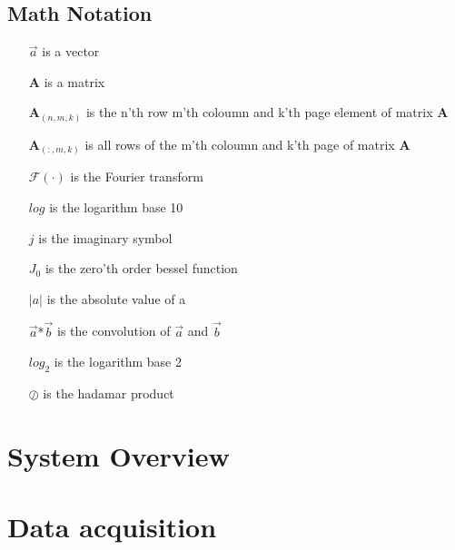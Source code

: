 \chapter*{Math Notation}
\begin{itemize}
\item[{$\overrightarrow{a}$}] is a vector
\item[{$\textbf{A}$}] is a matrix
\item[{$\textbf{A}_{(n,m,k)}$}] is the n'th row m'th coloumn and k'th page element of matrix \textbf{A}
\item[{$\textbf{A}_{(:,m,k)}$}] is all rows of the m'th coloumn and k'th page of matrix \textbf{A}
\item[{$\mathcal{F}(\cdot)$}] is the Fourier transform
\item[{$log$}] is the logarithm base 10
\item[{$j$}] is the imaginary symbol
\item[{$J_0$}] is the zero'th order bessel function
\item[{$|a|$}] is the absolute value of a
\item[{$\overrightarrow{a}$*$\overrightarrow{b}$}] is the convolution of $\overrightarrow{a}$ and $\overrightarrow{b}$
\item[{$log_2$}] is the logarithm base 2
\item[{$\oslash$}] is the hadamar product
\end{itemize}

\cleardoublepage


\cleardoublepage
	

\fancyhead[RE,LO]{}
\fancyhead[RO,LE]{\small\nouppercase\leftmark} %





\pagestyle{fancy}
\makeatletter



\part{System Overview}



\part{Data acquisition}

	







